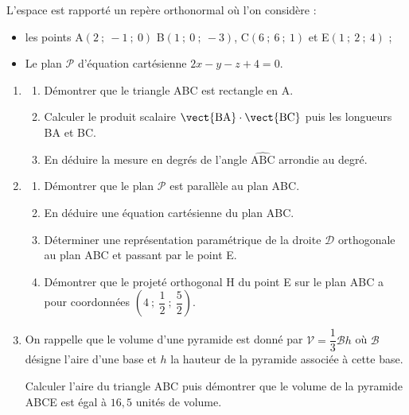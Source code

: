 \medskip

L'espace est rapporté un repère orthonormal où l'on considère :

\setlength\parindent{1cm}
\begin{itemize}
\item[$\bullet~~$]les points A$(2~;~-1~;~0)$ B$(1~;~0~;~- 3)$, C$(6~;~6~;~1)$  et E$(1~;~2~;~4)$ ;
\item[$\bullet~~$]Le plan $\mathcal{P}$ d'équation cartésienne $2x - y - z + 4 = 0$.
\end{itemize}
\setlength\parindent{0cm}

\medskip

\begin{enumerate}
\item
	\begin{enumerate}
		\item Démontrer que le triangle ABC est rectangle en A.
		\item Calculer le produit scalaire $\vect{\text{BA}} \cdot \vect{\text{BC}}$ puis les longueurs BA et BC.
		\item En déduire la mesure en degrés de l'angle $\widehat{\text{ABC}}$ arrondie au degré.
	\end{enumerate}
\item
	\begin{enumerate}
		\item Démontrer que le plan $\mathcal{P}$ est parallèle au plan ABC.
		\item En déduire une équation cartésienne du plan ABC.
		\item Déterminer une représentation paramétrique de la droite $\mathcal{D}$ orthogonale au plan ABC et passant par le point E.
		\item Démontrer que le projeté orthogonal H  du point E sur le plan ABC a pour coordonnées $\left(4~;~\dfrac{1}{2}~;~\dfrac{5}{2}\right)$.
	\end{enumerate}
\item On rappelle que le volume d'une pyramide est donné par $\mathcal{V} = \dfrac13 \mathcal{B}h$ où $\mathcal{B}$ désigne l'aire d'une base et $h$  la hauteur de la pyramide associée à cette base.

Calculer l'aire du triangle ABC puis démontrer que le volume de la pyramide ABCE est égal à $16,5$ unités de volume.
\end{enumerate}
